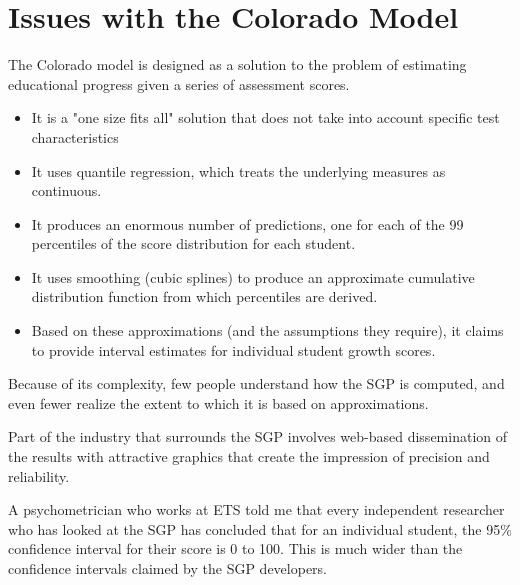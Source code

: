 \documentclass{amsart}
\begin{document}
\section*{Issues with the Colorado Model}
The Colorado model is designed as a solution to the problem of estimating educational progress given a series of assessment scores.
\begin{itemize}
\item It is a "one size fits all" solution that does not take into account specific test characteristics
\item It uses quantile regression, which treats the underlying measures as continuous.
\item It produces an enormous number of predictions, one for each of the 99 percentiles of the score distribution for each student.
\item It uses smoothing (cubic splines) to produce an approximate cumulative distribution function from which percentiles are derived.
\item Based on these approximations (and the assumptions they require), it claims to provide interval estimates for individual student growth scores.
\end{itemize}
Because of its complexity, few people understand how the SGP is computed, and even fewer realize the extent to which it is based on approximations.
\par\vspace{0.4 cm}
Part of the industry that surrounds the SGP involves web-based dissemination of the results with attractive graphics that create the impression of precision and reliability.  
\par\vspace{0.4 cm}
A psychometrician who works at ETS told me that every independent researcher who has looked at the SGP has concluded that for an individual student, the 95\% confidence interval for their score is 0 to 100.  This is much wider than the confidence intervals claimed by the SGP developers.
\end{document}
